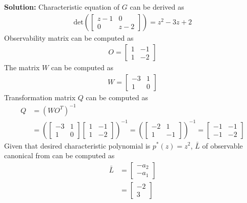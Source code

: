 \documentclass[twoside]{article}
\begin{document}
\textbf{Solution:} Characteristic equation of $G$ can be derived as
%
\begin{align*}
 \mathrm{det} \left(  \left[ \begin{array}{cc} z-1 & 0 \\ 0 &
                                                              z-2 \end{array} \right]  \right)
 = z^2 - 3 z + 2
\end{align*}
%
Observability matrix can be computed as
%
\begin{align*}
 O = \left[ \begin{array}{cc} 1 & -1 \\ 1 &
                                                              -2 \end{array} \right]
\end{align*}
%
The matrix $W$ can be computed as
%
\begin{align*}
  W =  \left[ \begin{array}{cc} -3 & 1 \\ 1 & 0 \end{array} \right]
\end{align*}
%
Transformation matrix $Q$ can be computed as
%
\begin{align*}
  Q &= \left( W O^T \right)^{-1}
\\
&= \left( 
\left[ \begin{array}{cc} -3 & 1 \\ 1 & 0 \end{array} \right] 
\left[ \begin{array}{cc} 1 & -1 \\ 1 & -2 \end{array} \right]
\right)^{-1}
= \left( 
\left[ \begin{array}{cc} -2 & 1 \\ 1 & -1 \end{array} \right] 
\right)^{-1}
=
\left[ \begin{array}{cc} -1 & -1 \\ -1 & -2 \end{array} \right] 
\end{align*}
%
%
Given that desired characteristic polynomial is $p^*(z) = z^2$,
$\bar{L}$ of observable canonical from can be computed as
%
\begin{align*}
  \bar{L} &= \left[ \begin{array}{c} - a_2 \\ -
                                                       a_1 \end{array}
                                                       \right]
\\
&= \left[ \begin{array}{c} -2 \\ 3 \end{array}
                                                       \right]
\end{align*}
\end{document}
